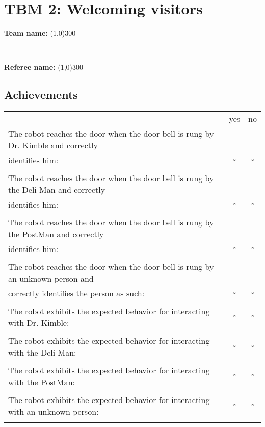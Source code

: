 \section*{TBM 2: Welcoming visitors}
\vspace{0.1cm} \begin{large} \textbf{Team name:} \line(1,0){300} \end{large} \vspace{0.7cm} \\ 
\vspace{0.1cm} \begin{large} \textbf{Referee name:} \line(1,0){300} \end{large}

\subsection*{Achievements}
\begin{tabular}{ l c c}
 & yes & no \\
The robot reaches the door when the door bell is rung by Dr. Kimble and correctly & &\\
identifies him: & $\square$ & $\square$ \\ \\

The robot reaches the door when the door bell is rung by the Deli Man and correctly & & \\
identifies him: & $\square$ & $\square$ \\ \\

The robot reaches the door when the door bell is rung by the PostMan and correctly & & \\
identifies him: & $\square$ & $\square$ \\ \\

The robot reaches the door when the door bell is rung by an unknown person and & & \\
correctly identifies the person as such: & $\square$ & $\square$ \\ \\

The robot exhibits the expected behavior for interacting with Dr. Kimble: & $\square$ & $\square$ \\ \\

The robot exhibits the expected behavior for interacting with the Deli Man: & $\square$ & $\square$ \\ \\
The robot exhibits the expected behavior for interacting with the PostMan: & $\square$ & $\square$ \\ \\
The robot exhibits the expected behavior for interacting with an unknown person: & $\square$ & $\square$ \\ \\
\end{tabular}


